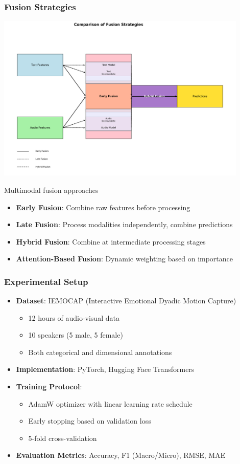 \documentclass{beamer}
\begin{document}
\begin{frame}
\frametitle{Fusion Strategies}
\begin{center}
\includegraphics[width=0.9\textwidth]{figures/fusion_strategies.png}
\caption{Multimodal fusion approaches}
\end{center}

\begin{itemize}
    \item \textbf{Early Fusion}: Combine raw features before processing
    \item \textbf{Late Fusion}: Process modalities independently, combine predictions
    \item \textbf{Hybrid Fusion}: Combine at intermediate processing stages
    \item \textbf{Attention-Based Fusion}: Dynamic weighting based on importance
\end{itemize}
\end{frame}

\begin{frame}
\frametitle{Experimental Setup}
\begin{itemize}
    \item \textbf{Dataset}: IEMOCAP (Interactive Emotional Dyadic Motion Capture)
    \begin{itemize}
        \item 12 hours of audio-visual data
        \item 10 speakers (5 male, 5 female)
        \item Both categorical and dimensional annotations
    \end{itemize}
    \item \textbf{Implementation}: PyTorch, Hugging Face Transformers
    \item \textbf{Training Protocol}:
    \begin{itemize}
        \item AdamW optimizer with linear learning rate schedule
        \item Early stopping based on validation loss
        \item 5-fold cross-validation
    \end{itemize}
    \item \textbf{Evaluation Metrics}: Accuracy, F1 (Macro/Micro), RMSE, MAE
\end{itemize}
\end{frame}
\end{document}
